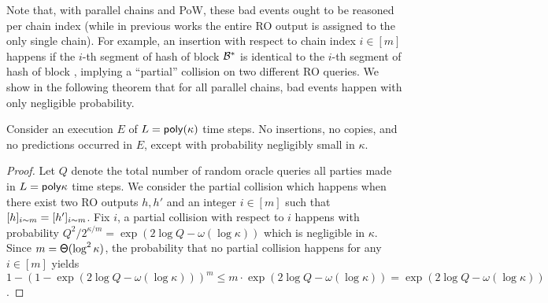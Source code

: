 Note that, with parallel chains and \mforone PoW, these bad events ought to be reasoned per chain index (while in previous works the entire RO output is assigned to the only single chain).
%
For example, an insertion with respect to chain index $i \in [m]$ happens if the $i$-th segment of hash of block $\mathcal{B}^*$ is identical to the $i$-th segment of hash of block \block, implying a ``partial'' collision on two different RO queries.
%
We show in the following theorem that for all parallel chains, bad events happen with only negligible probability.

\begin{theorem} \label{thm:no-bad-ro-events}
    Consider an execution $E$ of $L = \mathsf{poly} (\kappa)$ time steps.
    No insertions, no copies, and no predictions occurred in $E$, except with probability negligibly small in $\kappa$.
\end{theorem}

\begin{proof}
    Let $Q$ denote the total number of random oracle queries all parties made in $L = \mathsf{poly} \kappa$ time steps.
    We consider the partial collision which happens when there exist two RO outputs $h, h'$ and an integer $i \in [m]$ such that $[h]_{i\sim m} = [h']_{i\sim m}$.
    Fix $i$, a partial collision with respect to $i$ happens with probability $Q^2 / 2^{\kappa / m} = \exp(2\log Q - \omega(\log \kappa))$ which is negligible in $\kappa$.
    Since $m = \mathsf{\Theta}(\log^2 \kappa)$, the probability that no partial collision happens for any $i \in [m]$ yields $1 - (1 - \exp(2\log Q - \omega(\log \kappa)))^m \le m \cdot \exp(2\log Q - \omega(\log \kappa)) = \exp(2\log Q - \omega(\log \kappa))$.
\end{proof}
